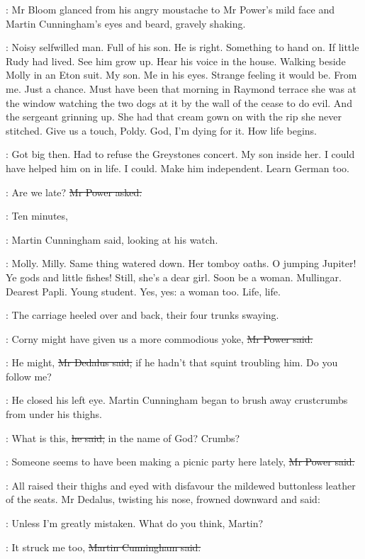:
Mr Bloom glanced from his angry moustache
to Mr Power's mild face
and Martin Cunningham's eyes and beard,
gravely shaking.

\BloomInt:
Noisy selfwilled man.
Full of his son.
He is right.
Something to hand on.
If little Rudy had lived.
See him grow up.
Hear his voice in the house.
Walking beside Molly in an Eton suit.
My son.
Me in his eyes.
Strange feeling it would be.
From me.
Just a chance.
Must have been that morning in Raymond terrace
she was at the window watching the two dogs at it
by the wall of the cease to do evil.
And the sergeant grinning up.
She had that cream gown on with the rip she never stitched.
Give us a touch, Poldy.
God, I'm dying for it.
How life begins.

\BloomInt:
Got big then.
Had to refuse the Greystones concert.
My son inside her.
I could have helped him on in life.
I could.
Make him independent.
Learn German too.

\power:
Are we late?
\sout{Mr Power asked.}

\cunningham:
Ten minutes,

:
Martin Cunningham said, looking at his watch.

\BloomInt:
Molly.
Milly.
Same thing watered down.
Her tomboy oaths.
O jumping Jupiter!
Ye gods and little fishes!
Still, she's a dear girl.
Soon be a woman.
Mullingar.
Dearest Papli.
Young student.
Yes, yes:
a woman too.
Life, life.

:
The carriage heeled over and back,
their four trunks swaying.

\power:
Corny might have given us a more commodious yoke,
\sout{Mr Power said.}

\simon:
He might,
\sout{Mr Dedalus said,}
if he hadn't that squint troubling him.
Do you follow me?

:
He closed his left eye.
Martin Cunningham began to brush away crustcrumbs from under his thighs.

\cunningham:
What is this,
\sout{he said,}
in the name of God?
Crumbs?

\power:
Someone seems to have been making a picnic party here lately,
\sout{Mr Power said.}

:
All raised their thighs and eyed with disfavour
the mildewed buttonless leather of the seats.
Mr Dedalus, twisting his nose, frowned downward and said:

\simon:
Unless I'm greatly mistaken.
What do you think, Martin?

\cunningham:
It struck me too,
\sout{Martin Cunningham said.}

